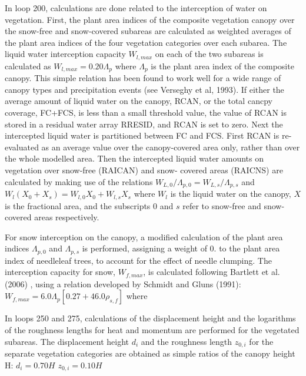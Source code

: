 In loop 200, calculations are done related to the interception of water on vegetation. First, the plant area indices of the composite vegetation canopy over the snow-\/free and snow-\/covered subareas are calculated as weighted averages of the plant area indices of the four vegetation categories over each subarea. The liquid water interception capacity $W_{l,max}$ on each of the two subareas is calculated as $W_{l,max} = 0.20 \Lambda_p$ where $\Lambda_p$ is the plant area index of the composite canopy. This simple relation has been found to work well for a wide range of canopy types and precipitation events (see Verseghy et al, 1993). If either the average amount of liquid water on the canopy, R\+C\+A\+N, or the total cancpy coverage, F\+C+\+F\+C\+S, is less than a small threshold value, the value of R\+C\+A\+N is stored in a residual water array R\+R\+E\+S\+I\+D, and R\+C\+A\+N is set to zero. Next the intercepted liquid water is partitioned between F\+C and F\+C\+S. First R\+C\+A\+N is re-\/ evaluated as an average value over the canopy-\/covered area only, rather than over the whole modelled area. Then the intercepted liquid water amounts on vegetation over snow-\/free (R\+A\+I\+C\+A\+N) and snow-\/ covered areas (R\+A\+I\+C\+N\+S) are calculated by making use of the relations $W_{L,0} / \Lambda_{p,0} = W_{L,s} / \Lambda_{p,s}$ and $W_l (X_0 + X_s) = W_{l,0} X_0 + W_{l,s} X_s$ where $W_l$ is the liquid water on the canopy, $X$ is the fractional area, and the subscripts $0$ and $s$ refer to snow-\/free and snow-\/covered areas respectively.

For snow interception on the canopy, a modified calculation of the plant area indices $\Lambda_{p,0}$ and $\Lambda_{p,s}$ is performed, assigning a weight of 0. to the plant area index of needleleaf trees, to account for the effect of needle clumping. The interception capacity for snow, $W_{f,max}$, is calculated following Bartlett et al. (2006) \cite{Bartlett2006-xp}, using a relation developed by Schmidt and Gluns (1991)\+: $W_{f,max} = 6.0 \Lambda_p [0.27 + 46.0 \rho_{s,f} ]$ where

In loops 250 and 275, calculations of the displacement height and the logarithms of the roughness lengths for heat and momentum are performed for the vegetated subareas. The displacement height $d_i$ and the roughness length $z_{0,i}$ for the separate vegetation categories are obtained as simple ratios of the canopy height H\+: $d_i = 0.70 H$ $z_{0,i} = 0.10 H$


